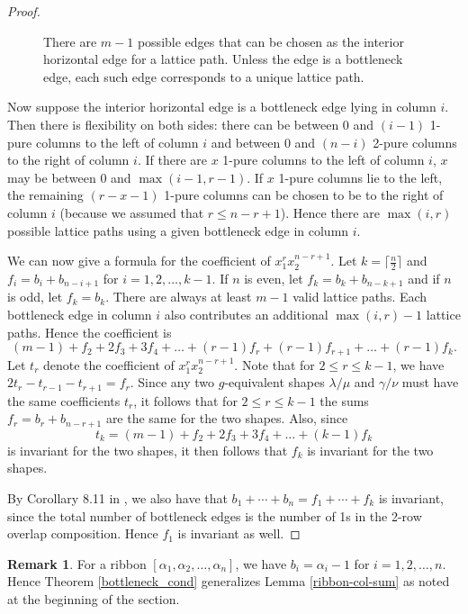 \documentclass[12pt]{amsart}
\theoremstyle{definition}
\newtheorem{remark}[thm]{Remark}
\begin{document}
\begin{proof}
\begin{figure}[h]
\caption{There are $m-1$ possible edges that can be chosen as the interior horizontal edge for a lattice path. Unless the edge is a bottleneck edge, each such edge corresponds to a unique lattice path.} \label{possible_edges}
\label{12RPPex}
\end{figure}

Now suppose the interior horizontal edge is a bottleneck edge lying in column $i$. Then there is flexibility on both sides: there can be between 0 and $(i-1)$ 1-pure columns to the left of column $i$ and between $0$ and $(n-i)$ 2-pure columns to the right of column $i$. If there are $x$ 1-pure columns to the left of column $i$, $x$ may be between 0 and $\max(i-1,r-1)$. If $x$ 1-pure columns lie to the left, the remaining $(r-x-1)$ 1-pure columns can be chosen to be to the right of column $i$ (because we assumed that $r \leq n-r+1$). Hence there are $\max(i,r)$ possible lattice paths using a given bottleneck edge in column $i$. 

We can now give a formula for the coefficient of $x_1^r x_2^{n-r+1}$. Let $k = \lceil\frac{n}{2}\rceil$ and $f_i= b_i + b_{n-i+1}$ for $i=1, 2, \ldots, k-1$. If $n$ is even, let $f_k = b_k + b_{n-k+1}$ and if $n$ is odd, let $f_k = b_k$. There are always at least $m-1$ valid lattice paths. Each bottleneck edge in column $i$ also contributes an additional $\max(i,r)-1$ lattice paths. Hence the coefficient is 
\[
(m - 1) + f_2 + 2f_3+3f_4+ \ldots + (r-1)f_r + (r-1)f_{r+1}+ \ldots + (r-1)f_k.
\]
Let $t_r$ denote the coefficient of $x_1^{r}x_2^{n-r+1}$. Note that for $2\leq{r}\leq{k-1}$, we have $2t_{r}-t_{r-1}-t_{r+1}=f_r$. Since any two $g$-equivalent shapes $\lambda/\mu$ and $\gamma/\nu$ must have the same coefficients $t_r$, it follows that for $2\leq{r}\leq{k-1}$ the sums $f_r = b_r + b_{n-r+1}$ are the same for the two shapes. Also, since
\[
t_k = (m - 1) + f_2 + 2f_3+3f_4+ \ldots + (k-1)f_k 
\]
is invariant for the two shapes, it then follows that $f_k$ is invariant for the two shapes.

By Corollary 8.11 in \cite{rsw2009coincidences}, we also have that $b_1 + \cdots + b_n = f_1 + \cdots + f_k$ is invariant, since the total number of bottleneck edges is the number of 1s in the 2-row overlap composition. Hence $f_1$ is invariant as well.
\end{proof}

\begin{remark}
For a ribbon $[\alpha_1, \alpha_2, \ldots, \alpha_n]$, we have $b_i = \alpha_i - 1$ for $i=1, 2, \ldots , n$. Hence Theorem \ref{bottleneck_cond} generalizes Lemma \ref{ribbon-col-sum} as noted at the beginning of the section.
\end{remark}
\end{document}
